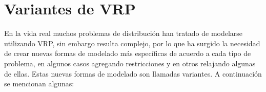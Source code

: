 \begin{comment}
\section{Formulación} \label{sect:formulacion}

VRP puede ser definido formalmente utilizando la formulación propuesta por Level y Palhazi\cite{tesisdanielernesto}: \\

Usualmente el problema es modelado utilizando un grafo, donde los vértices representan los clientes (incluyendo el depósito) y los arcos llevan asociados un costo (que usualmente es visto como la distancia entre dos puntos).

Sean $n$ el número de clientes, $k$ el número de vehículos disponibles y $G = (V, E)$ un grafo completo donde $V = \{0,1,...,n\}$ es el conjunto de vértices y $E = \{(i,j)|(i,j) \in V \times V \ \wedge \ i \not= j\}$ es el conjunto de arcos. El vértice $0$ representa al depósito y los vértices $q = 1,2,...,n$ corresponden a los clientes que deben ser suplidos. Los arcos representan los costos de los caminos que puede utilizar la red de transporte.

Una solución esta formada por una conjunto de rutas $R = \{r_1,r_2,...,r_k\}$, las cuales deben cumplir las siguientes condiciones:

\begin{itemize}

	\item Cada ruta $r_i \in R$ debe iniciar y terminar en el depósito.
	\item Cada vértice $v_i \in V - \{0\}$ debe ser visitado una y sólo una vez.

\end{itemize}
\end{comment}


\section{Variantes de VRP} \label{sect:variantes}

En la vida real muchos problemas de distribución han tratado de modelarse utilizando VRP, sin embargo resulta complejo, por lo que ha surgido la necesidad de crear nuevas formas de modelado más específicas de acuerdo a cada tipo de problema, en algunos casos agregando restricciones y en otros relajando algunas de ellas. Estas nuevas formas de modelado son llamadas variantes. A continuación se mencionan algunas:

